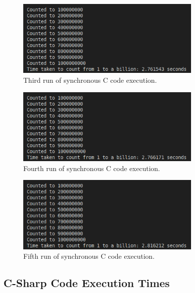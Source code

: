\documentclass[12pt,a4paper]{article}
\begin{document}
\begin{figure}[htbp]
    \centering
    \includegraphics[width=0.8\textwidth]{../sync_records/results_c/result_3.png}
    \caption{Third run of synchronous C code execution.}
    \label{fig:C-runtime-3}
\end{figure}

\begin{figure}[htbp]
    \centering
    \includegraphics[width=0.8\textwidth]{../sync_records/results_c/result_4.png}
    \caption{Fourth run of synchronous C code execution.}
    \label{fig:C-runtime-4}
\end{figure}

\begin{figure}[htbp]
    \centering
    \includegraphics[width=0.8\textwidth]{../sync_records/results_c/result_5.png}
    \caption{Fifth run of synchronous C code execution.}
    \label{fig:C-runtime-5}
\end{figure}

\clearpage
\subsection{C-Sharp Code Execution Times} 
\end{document}
